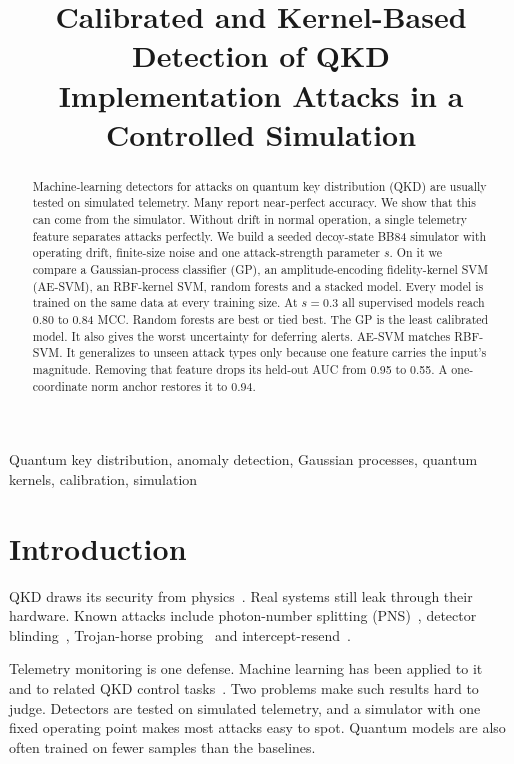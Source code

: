 \documentclass[conference,10pt]{IEEEtran}
\title{Calibrated and Kernel-Based Detection of QKD\\Implementation Attacks in a Controlled Simulation}
\author{
  \IEEEauthorblockN{Arnav Kapoor}
  \IEEEauthorblockA{Department of Computer Science\\
  \textit{IISER Bhopal}\\
  Bhopal, India\\
  arnavkapoor23@iiserb.ac.in}
}
\begin{document}
\maketitle

\begin{abstract}
Machine-learning detectors for attacks on quantum key distribution (QKD) are
usually tested on simulated telemetry. Many report near-perfect accuracy. We
show that this can come from the simulator. Without drift in normal operation, a
single telemetry feature separates attacks perfectly. We build a seeded
decoy-state BB84 simulator with operating drift, finite-size noise and one
attack-strength parameter $s$. On it we compare a Gaussian-process classifier
(GP), an amplitude-encoding fidelity-kernel SVM (AE-SVM), an RBF-kernel SVM,
random forests and a stacked model. Every model is trained on the same data at
every training size. At $s=0.3$ all supervised models reach 0.80 to 0.84 MCC.
Random forests are best or tied best. The GP is the least calibrated model. It
also gives the worst uncertainty for deferring alerts. AE-SVM matches RBF-SVM.
It generalizes to unseen attack types only because one feature carries the
input's magnitude. Removing that feature drops its held-out AUC from 0.95 to
0.55. A one-coordinate norm anchor restores it to 0.94.
\end{abstract}

\begin{IEEEkeywords}
Quantum key distribution, anomaly detection, Gaussian processes, quantum kernels, calibration, simulation
\end{IEEEkeywords}

\section{Introduction}

QKD draws its security from physics~\cite{bennett1984quantum,gisin2002quantum}.
Real systems still leak through their hardware. Known attacks include
photon-number splitting (PNS)~\cite{huttner1995photon,lutkenhaus2002pns},
detector blinding~\cite{makarov2006effects,lydersen2010hacking}, Trojan-horse
probing~\cite{gisin2006trojan,jain2014trojan} and
intercept-resend~\cite{bennett1992experimental}.

Telemetry monitoring is one defense. Machine learning has been applied to
it~\cite{mao2020detecting} and to related QKD control tasks~\cite{ren2021machine}.
Two problems make such results hard to judge. Detectors are tested on simulated
telemetry, and a simulator with one fixed operating point makes most attacks easy
to spot. Quantum models are also often trained on fewer samples than the
baselines.
\end{document}
